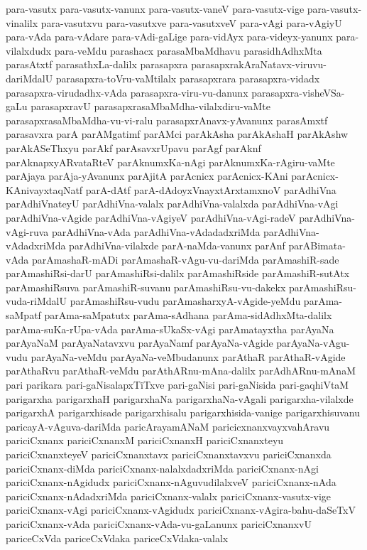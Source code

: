 {para-vasutx
para-vasutx-vanunx
para-vasutx-vaneV
para-vasutx-vige
para-vasutx-vinalilx
para-vasutxvu
para-vasutxve
para-vasutxveV
para-vAgi
para-vAgiyU
para-vAda
para-vAdare
para-vAdi-gaLige
para-vidAyx
para-videyx-yanunx
para-vilalxdudx
para-veMdu
parashacx
parasaMbaMdhavu
parasidhAdhxMta
parasAtxtf
parasathxLa-dalilx
parasapxra
parasapxrakAraNatavx-viruvu-dariMdalU
parasapxra-toVru-vaMtilalx
parasapxrara
parasapxra-vidadx
parasapxra-virudadhx-vAda
parasapxra-viru-vu-danunx
parasapxra-visheVSa-gaLu
parasapxravU
parasapxrasaMbaMdha-vilalxdiru-vaMte
parasapxrasaMbaMdha-vu-vi-ralu
parasapxrAnavx-yAvanunx
parasAmxtf
parasavxra
parA
parAMgatimf
parAMci
parAkAsha
parAkAshaH
parAkAshw
parAkASeThxyu
parAkf
parAsavxrUpavu
parAgf
parAknf
parAknapxyARvataRteV
parAknumxKa-nAgi
parAknumxKa-rAgiru-vaMte
parAjaya
parAja-yAvanunx
parAjitA
parAcnicx
parAcnicx-KAni
parAcnicx-KAnivayxtaqNatf
parA-dAtf
parA-dAdoyxVnayxtArxtamxnoV
parAdhiVna
parAdhiVnateyU
parAdhiVna-valalx
parAdhiVna-valalxda
parAdhiVna-vAgi
parAdhiVna-vAgide
parAdhiVna-vAgiyeV
parAdhiVna-vAgi-radeV
parAdhiVna-vAgi-ruva
parAdhiVna-vAda
parAdhiVna-vAdadadxriMda
parAdhiVna-vAdadxriMda
parAdhiVna-vilalxde
parA-naMda-vanunx
parAnf
parABimata-vAda
parAmashaR-mADi
parAmashaR-vAgu-vu-dariMda
parAmashiR-sade
parAmashiRsi-darU
parAmashiRsi-dalilx
parAmashiRside
parAmashiR-sutAtx
parAmashiRsuva
parAmashiR-suvanu
parAmashiRsu-vu-dakekx
parAmashiRsu-vuda-riMdalU
parAmashiRsu-vudu
parAmasharxyA-vAgide-yeMdu
parAma-saMpatf
parAma-saMpatutx
parAma-sAdhana
parAma-sidAdhxMta-dalilx
parAma-suKa-rUpa-vAda
parAma-sUkaSx-vAgi
parAmatayxtha
parAyaNa
parAyaNaM
parAyaNatavxvu
parAyaNamf
parAyaNa-vAgide
parAyaNa-vAgu-vudu
parAyaNa-veMdu
parAyaNa-veMbudanunx
parAthaR
parAthaR-vAgide
parAthaRvu
parAthaR-veMdu
parAthARnu-mAna-dalilx
parAdhARnu-mAnaM
pari
parikara
pari-gaNisalapxTiTxve
pari-gaNisi
pari-gaNisida
pari-gaqhiVtaM
parigarxha
parigarxhaH
parigarxhaNa
parigarxhaNa-vAgali
parigarxha-vilalxde
parigarxhA
parigarxhisade
parigarxhisalu
parigarxhisida-vanige
parigarxhisuvanu
paricayA-vAguva-dariMda
paricArayamANaM
paricicxnanxvayxvahAravu
pariciCxnanx
pariciCxnanxM
pariciCxnanxH
pariciCxnanxteyu
pariciCxnanxteyeV
pariciCxnanxtavx
pariciCxnanxtavxvu
pariciCxnanxda
pariciCxnanx-diMda
pariciCxnanx-nalalxdadxriMda
pariciCxnanx-nAgi
pariciCxnanx-nAgidudx
pariciCxnanx-nAguvudilalxveV
pariciCxnanx-nAda
pariciCxnanx-nAdadxriMda
pariciCxnanx-valalx
pariciCxnanx-vasutx-vige
pariciCxnanx-vAgi
pariciCxnanx-vAgidudx
pariciCxnanx-vAgira-bahu-daSeTxV
pariciCxnanx-vAda
pariciCxnanx-vAda-vu-gaLanunx
pariciCxnanxvU
pariceCxVda
pariceCxVdaka
pariceCxVdaka-valalx
}
